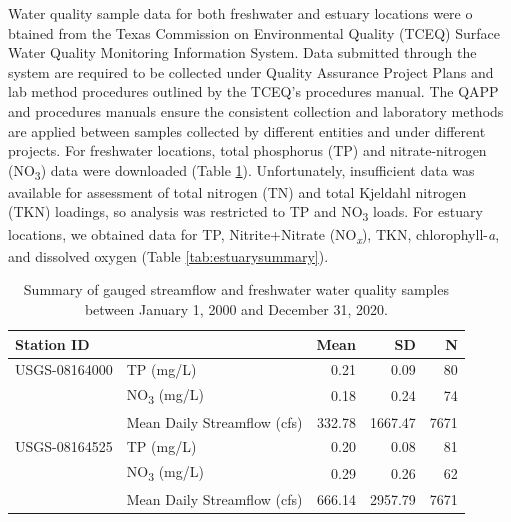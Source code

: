 \documentclass[water,article,submit,oneauthor]{Definitions/mdpi}
\begin{document}
Water quality sample data for both freshwater and estuary locations were
o btained from the Texas Commission on Environmental Quality (TCEQ)
Surface Water Quality Monitoring Information System. Data submitted
through the system are required to be collected under Quality Assurance
Project Plans and lab method procedures outlined by the TCEQ's
procedures manual. The QAPP and procedures manuals ensure the consistent
collection and laboratory methods are applied between samples collected
by different entities and under different projects. For freshwater
locations, total phosphorus (TP) and nitrate-nitrogen
(NO\textsubscript{3}) data were downloaded (Table \ref{tab:fwsummary}).
Unfortunately, insufficient data was available for assessment of total
nitrogen (TN) and total Kjeldahl nitrogen (TKN) loadings, so analysis
was restricted to TP and NO\textsubscript{3} loads. For estuary
locations, we obtained data for TP, Nitrite+Nitrate
(NO\emph{\textsubscript{x}}), TKN, chlorophyll-\emph{a}, and dissolved
oxygen (Table \ref{tab:estuarysummary}).

\begin{table}[H]

\caption{\label{tab:fwsummary}Summary of gauged streamflow and freshwater water quality samples between January 1, 2000 and December 31, 2020.}
\centering
\begin{tabular}[t]{llrrr}
\toprule
Station ID &   & Mean & SD & N\\
\midrule
USGS-08164000 & TP (mg/L) & \num{0.21} & \num{0.09} & 80\\
 & NO\textsubscript{3} (mg/L) & \num{0.18} & \num{0.24} & 74\\
 & Mean Daily Streamflow (cfs) & \num{332.78} & \num{1667.47} & 7671\\
USGS-08164525 & TP (mg/L) & \num{0.20} & \num{0.08} & 81\\
 & NO\textsubscript{3} (mg/L) & \num{0.29} & \num{0.26} & 62\\
 & Mean Daily Streamflow (cfs) & \num{666.14} & \num{2957.79} & 7671\\
\bottomrule
\end{tabular}
\end{table}
\end{document}
